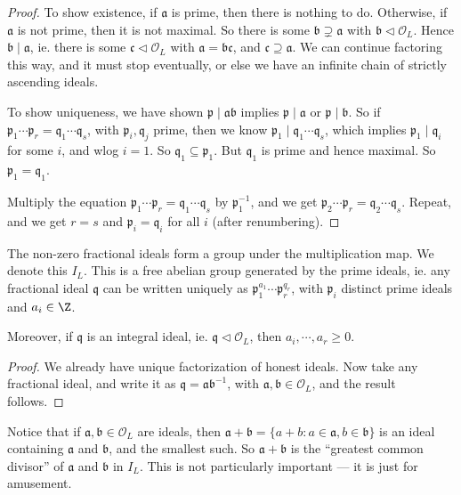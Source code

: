 \documentclass[a4paper]{article}
\begin{document}
\begin{proof}
  To show existence, if $\mathfrak{a}$ is prime, then there is nothing to do. Otherwise, if $\mathfrak{a}$ is not prime, then it is not maximal. So there is some $\mathfrak{b} \supsetneq \mathfrak{a}$ with $\mathfrak{b} \lhd \mathcal{O}_L$. Hence $\mathfrak{b} \mid \mathfrak{a}$, ie. there is some $\mathfrak{c} \lhd \mathcal{O}_L$ with $\mathfrak{a} = \mathfrak{b} \mathfrak{c}$, and $\mathfrak{c} \supseteq \mathfrak{a}$. We can continue factoring this way, and it must stop eventually, or else we have an infinite chain of strictly ascending ideals.

  To show uniqueness, we have shown $\mathfrak{p} \mid \mathfrak{a}\mathfrak{b}$ implies $\mathfrak{p} \mid \mathfrak{a}$ or $\mathfrak{p} \mid \mathfrak{b}$. So if $\mathfrak{p}_1 \cdots \mathfrak{p}_r = \mathfrak{q}_1 \cdots \mathfrak{q}_s$, with $\mathfrak{p}_i, \mathfrak{q}_j$ prime, then we know $\mathfrak{p}_1 \mid \mathfrak{q}_1 \cdots \mathfrak{q}_s$, which implies $\mathfrak{p}_1 \mid \mathfrak{q}_i$ for some $i$, and wlog $i = 1$. So $\mathfrak{q}_1 \subseteq \mathfrak{p}_1$. But $\mathfrak{q}_1$ is prime and hence maximal. So $\mathfrak{p}_1 = \mathfrak{q}_1$.

  Multiply the equation $\mathfrak{p}_1 \cdots \mathfrak{p}_r = \mathfrak{q}_1 \cdots \mathfrak{q}_s$ by $\mathfrak{p}_1^{-1}$, and we get $\mathfrak{p}_2 \cdots \mathfrak{p}_r = \mathfrak{q}_2 \cdots \mathfrak{q}_s$. Repeat, and we get $r = s$ and $\mathfrak{p}_i = \mathfrak{q}_i$ for all $i$ (after renumbering).
\end{proof}

\begin{cor}
  The non-zero fractional ideals form a group under the multiplication map. We denote this $I_L$. This is a free abelian group generated by the prime ideals, ie. any fractional ideal $\mathfrak{q}$ can be written uniquely as $\mathfrak{p}_1^{a_1} \cdots \mathfrak{p}_r^{q_r}$, with $\mathfrak{p}_i$ distinct prime ideals and $a_i \in \Z$.

  Moreover, if $\mathfrak{q}$ is an integral ideal, ie. $\mathfrak{q} \lhd \mathcal{O}_L$, then $a_i, \cdots, a_r \geq 0$.
\end{cor}

\begin{proof}
  We already have unique factorization of honest ideals. Now take any fractional ideal, and write it as $\mathfrak{q} = \mathfrak{a} \mathfrak{b}^{-1}$, with $\mathfrak{a}, \mathfrak{b} \in \mathcal{O}_L$, and the result follows.
\end{proof}
Notice that if $\mathfrak{a}, \mathfrak{b} \in \mathcal{O}_L$ are ideals, then $\mathfrak{a} + \mathfrak{b} = \{a + b: a \in \mathfrak{a}, b \in \mathfrak{b}\}$ is an ideal containing $\mathfrak{a}$ and $\mathfrak{b}$, and the smallest such. So $\mathfrak{a} + \mathfrak{b}$ is the ``greatest common divisor'' of $\mathfrak{a}$ and $\mathfrak{b}$ in $I_L$. This is not particularly important --- it is just for amusement.
\end{document}
